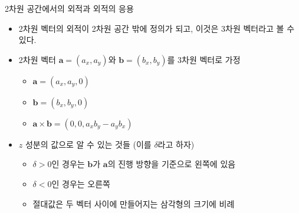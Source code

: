 \documentclass{beamer}
\begin{document}
\begin{frame}{2차원 공간에서의 외적과 외적의 응용}
\begin{itemize}
\item 2차원 벡터의 외적이 2차원 공간 밖에 정의가 되고, 이것은 3차원 벡터라고 볼 수 있다.
\item 2차원 벡터 $\mathbf a = (a_x, a_y)$와 $\mathbf b= (b_x, b_y)$를 3차원 벡터로 가정
	\begin{itemize}
	\item $\mathbf a = (a_x , a_y, 0)$
	\item $\mathbf b = (b_x , b_y, 0)$
	\item $\mathbf a \times \mathbf b = (0, 0, a_x b_y - a_y b_x )$
	\end{itemize}
\end{itemize}

\begin{itemize}
\item $z$ 성분의 값으로 알 수 있는 것들  (이를 $\delta$라고 하자) 
	\begin{itemize}
	\item $\delta>0$인 경우는 $\mathbf b$가 $\mathbf a$의 진행 방향을 기준으로 왼쪽에 있음
	\item $\delta<0$인 경우는 오른쪽
	\item 절대값은 두 벡터 사이에 만들어지는 삼각형의 크기에 비례
	\end{itemize}
\end{itemize}

\end{frame}
\end{document}
